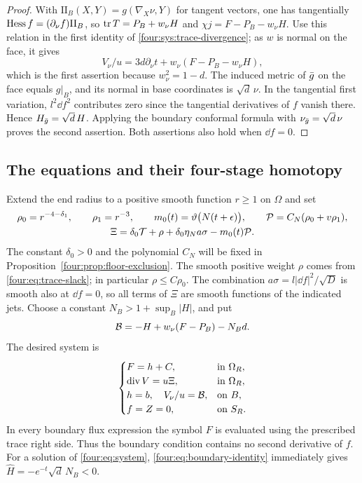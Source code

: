 \begin{proof}
With $\mathrm{II}_B(X,Y)=g(\nabla_X\nu,Y)$ for tangent vectors,
one has tangentially $\operatorname{Hess} f=(\partial_\nu f)\mathrm{II}_B$, so
$\operatorname{tr} T=P_B+w_\nu H$ and
$\chi j=F-P_B-w_\nu H$.  Use this relation in the first identity of
\eqref{four:sys:trace-divergence}; as $w$ is normal on the face, it gives
\[
 V_\nu/u=3d\partial_\nu t+w_\nu(F-P_B-w_\nu H),
\]
which is the first assertion because $w_\nu^2=1-d$.  The induced
metric of $\bar g$ on the face equals $g|_B$, and its normal in base
coordinates is $\sqrt d\,\nu$.  In the tangential first variation,
$l^2\dd f^2$ contributes zero since the tangential derivatives of $f$
vanish there.  Hence $H_{\bar g}=\sqrt d\,H$.  Applying the boundary
conformal formula with $\nu_{\bar g}=\sqrt d\,\nu$ proves the second
assertion.  Both assertions also hold when $\dd f=0$.
\end{proof}

\subsection{The equations and their four-stage homotopy}

Extend the end radius to a positive smooth function $r\ge1$ on $\Omega$
and set
\begin{equation}\label{four:sys:source}
\begin{gathered}
 \rho_0=r^{-4-\delta_1},\qquad \rho_1=r^{-3},\qquad
 m_0(t)=\vartheta\bigl(N(t+\epsilon)\bigr),\qquad
 \mathcal P=C_N(\rho_0+v\rho_1),\\
 \Xi=\delta_0\mathcal T+\rho+\delta_0\eta_N a\sigma-m_0(t)\mathcal P.
\end{gathered}
\end{equation}
The constant $\delta_0>0$ and the polynomial $C_N$ will be fixed in
Proposition~\ref{four:prop:floor-exclusion}.  The smooth positive weight
$\rho$ comes from \eqref{four:eq:trace-slack}; in particular
$\rho\le C\rho_0$.  The combination
$a\sigma=l|\dd f|^2/\sqrt D$ is smooth also at $\dd f=0$, so all
terms of $\Xi$ are smooth functions of the indicated jets.
Choose a constant $N_B>1+\sup_B|H|$, and put
\[
 \mathcal B=-H+w_\nu(F-P_B)-N_Bd.
\]
The desired system is
\begin{equation}\label{four:eq:system}
\begin{cases}
 F=h+C, &\text{in }\Omega_R,\\
 \operatorname{div} V=u\Xi, &\text{in }\Omega_R,\\
 h=b,\quad V_\nu/u=\mathcal B, &\text{on }B,\\
 f=Z=0, &\text{on }S_R.
\end{cases}
\end{equation}
In every boundary flux expression the symbol $F$ is evaluated using the
prescribed trace right side.  Thus the boundary condition contains no
second derivative of $f$.  For a solution of \eqref{four:eq:system},
\eqref{four:eq:boundary-identity} immediately gives
$\widehat H=-e^{-t}\sqrt d\,N_B<0$.

